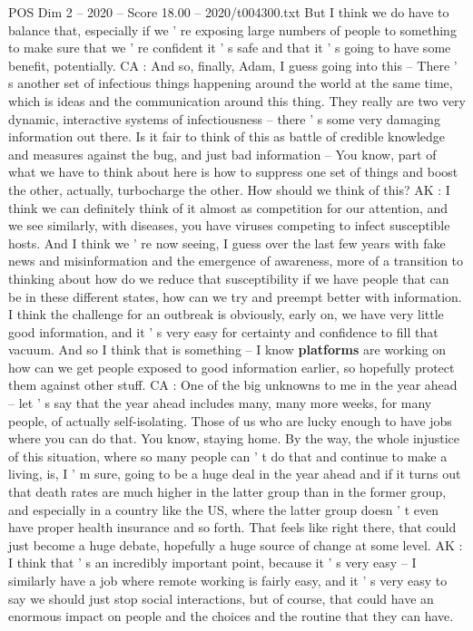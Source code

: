 \begin{textsample}{POS Dim 2 – 2020 – Score 18.00 – 2020/t004300.txt}
But I think we do have to balance that, especially if we ' re exposing large numbers of people to something to make sure that we ' re confident it ' s safe and that it ' s going to have some benefit, potentially.
CA : And so, finally, Adam, I guess going into this -- There ' s another set of infectious things happening around the world at the same time, which is ideas and the communication around this thing.
They really are two very dynamic, interactive systems of infectiousness -- there ' s some very damaging information out there.
Is it fair to think of this as battle of credible knowledge and measures against the bug, and just bad information -- You know, part of what we have to think about here is how to suppress one set of things and boost the other, actually, turbocharge the other.
How should we think of this?
AK : I think we can definitely think of it almost as competition for our attention, and we see similarly, with diseases, you have viruses competing to infect susceptible hosts.
And I think we ' re now seeing, I guess over the last few years with fake news and misinformation and the emergence of awareness, more of a transition to thinking about how do we reduce that susceptibility if we have people that can be in these different states, how can we try and preempt better with information.
I think the challenge for an outbreak is obviously, early on, we have very little good information, and it ' s very easy for certainty and confidence to fill that vacuum.
And so I think that is something -- I know \textbf{platforms} are working on how can we get people exposed to good information earlier, so hopefully protect them against other stuff.
CA : One of the big unknowns to me in the year ahead -- let ' s say that the year ahead includes many, many more weeks, for many people, of actually self-isolating.
Those of us who are lucky enough to have jobs where you can do that.
You know, staying home.
By the way, the whole injustice of this situation, where so many people can ' t do that and continue to make a living, is, I ' m sure, going to be a huge deal in the year ahead and if it turns out that death rates are much higher in the latter group than in the former group, and especially in a country like the US, where the latter group doesn ' t even have proper health insurance and so forth.
That feels like right there, that could just become a huge debate, hopefully a huge source of change at some level.
AK : I think that ' s an incredibly important point, because it ' s very easy -- I similarly have a job where remote working is fairly easy, and it ' s very easy to say we should just stop social interactions, but of course, that could have an enormous impact on people and the choices and the routine that they can have.

\end{textsample}
